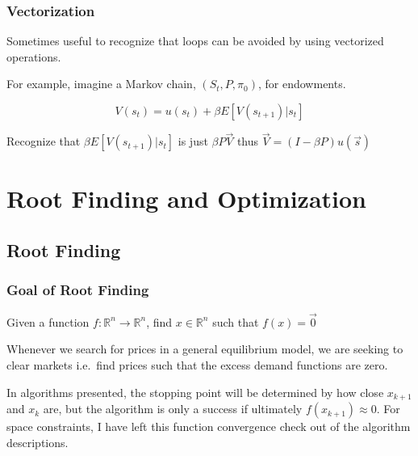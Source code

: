 \documentclass[10pt]{beamer}
\begin{document}
\begin{frame} \frametitle{Vectorization}

  Sometimes useful to recognize that loops can be avoided by using vectorized operations.

  For example, imagine a Markov chain, $(S_t, P, \pi_0)$, for endowments.

  $$V(s_t) = u(s_t) + \beta E \left[ V(s_{t+1}) | s_t \right]$$

  Recognize that $\beta E[V(s_{t+1}) | s_t]$ is just $\beta P \vec{V}$ thus $\vec{V} = (I - \beta P) u(\vec{s})$

\end{frame}


\section{Root Finding and Optimization}

\subsection{Root Finding}

\begin{frame} \frametitle{Goal of Root Finding}

  Given a function $f: \mathbb{R}^n \rightarrow \mathbb{R}^n$, find $x \in \mathbb{R}^n$ such that $f(x) = \vec{0}$

  Whenever we search for prices in a general equilibrium model, we are seeking to clear markets \textemdash{} i.e.\ find prices such that the excess demand functions are zero.

  In algorithms presented, the stopping point will be determined by how close $x_{k+1}$ and $x_k$ are, but the algorithm is only a success if ultimately $f(x_{k+1}) \approx 0$. For space constraints, I have left this function convergence check out of the algorithm descriptions.

\end{frame}
\end{document}
